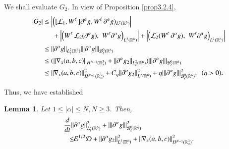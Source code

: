\documentclass{amsart}[12pt, article]
\newtheorem{lemm}[theo]{Lemma}
\begin{document}
We shall evaluate $G_2$. In view of Proposition \ref{prop3.2.4},
\begin{align*}
|G_2|&\le
\left|\Big([{{\mathcal L}}_1,W^\ell \,] {{\partial}}^\alpha g,W^\ell
\,{{\partial}}^\alpha
g)_{L^2({{{\mathbb R}}}^6)}\right|
\\&\hspace*{0.5cm}+
\left|\Big(W^\ell \,{{\mathcal L}}_2({{\partial}}^\alpha g),\,\,
W^\ell{{\partial}}^\alpha  g\Big)_{L^2({{{\mathbb R}}}^6)}\right|+
\left|\Big( {{\mathcal L}}_2(W^\ell \,{{\partial}}^\alpha g),\,\,
W^\ell{{\partial}}^\alpha  g\Big)_{L^2({{{\mathbb R}}}^6)}\right|
\\&\le
 ||{{\partial}}^\alpha
g||_{L^2_\ell({{{\mathbb R}}}^6)}|||{{\partial}}^\alpha
g|||_{{{\mathcal B}}^0_\ell({{{\mathbb R}}}^6)}
\\&\le (\|\nabla_x(a,b,c)\|_{H^{N-1}({{{\mathbb R}}}^3_x)}+\|{{\partial}}^\alpha g_2\|_{L^2_\ell({{{\mathbb R}}}^6)})|||{{\partial}}^\alpha
g|||_{{{\mathcal B}}^0_\ell({{{\mathbb R}}}^6)}
\\&\le
\|\nabla_x(a,b,c)\|_{H^{N-1}({{{\mathbb R}}}^3_x)}^2+
 {C_\eta||{{\partial}}^\alpha
g_2||_{L^2({{{\mathbb R}}}^6)}^2}+\eta|||{{\partial}}^\alpha
g|||_{{{\mathcal B}}^0_\ell({{{\mathbb R}}}^6)}^2, \ \ (\eta>0).
\end{align*}

Thus, we have established
\begin{lemm}
Let $ 1\le|\alpha|\le N, N\ge 3$. Then,
\begin{align}\label{microenergy2}
 \frac{d}{dt}\|&{{\partial}}^\alpha g\|^2_{L^2_\ell({{{\mathbb R}}}^6)}
+||| {{\partial}}^\alpha g |||^2_{{{\mathcal B}}^0_\ell({{{\mathbb R}}}^6)}
\\ \le&\notag
\mathcal{E}^{1/2}\mathcal{D}+||{{\partial}}^\alpha
g_2||_{L^2({{{\mathbb R}}}^6)}^2
+\|\nabla_x (a,b,c)\|_{H^{N-1}({{{\mathbb R}}}^3_x)}^2.
\end{align}
\end{lemm}
\end{document}
